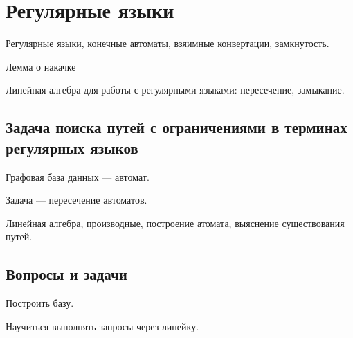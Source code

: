 \chapter{Регулярные языки}

Регулярные языки, конечные автоматы, взяимные конвертации, замкнутость.

Лемма о накачке

Линейная алгебра для работы с регулярными языками: пересечение, замыкание.



\section{Задача поиска путей с ограничениями в терминах регулярных языков}

Графовая база данных --- автомат.

Задача --- пересечение автоматов.

Линейная алгебра, производные, построение атомата, выяснение существования путей.

\section{Вопросы и задачи}

Построить базу.

Научиться выполнять запросы через линейку. 